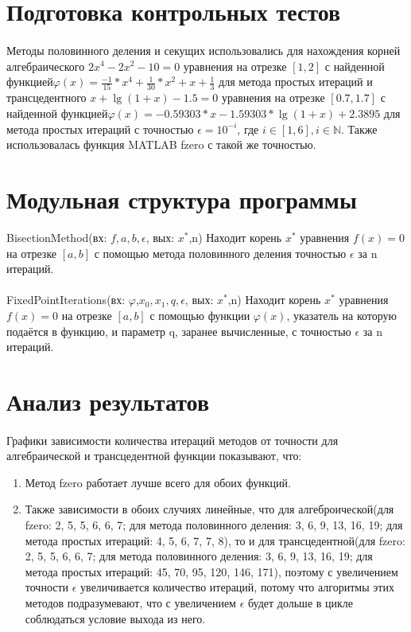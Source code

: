 \documentclass{article}
\begin{document}
	\section{Подготовка контрольных тестов}
	\paragraph{}Методы половинного деления и секущих использовались для нахождения корней алгебраического $2x^4-2x^2-10=0$ уравнения на отрезке $[1,2]$ с найденной функцией$\varphi(x) = \frac{-1}{15}*x^4 + \frac{1}{30}*x^2 + x + \frac{1}{3}$ для метода простых итераций и трансцедентного $x + \lg{(1+x)}-1.5=0$ уравнения на отрезке $[0.7,1.7]$ с найденной функцией$\varphi(x) = - 0.59303*x -1.59303*\lg{(1+x)} + 2.3895$ для метода простых итераций с точностью $\epsilon=10^{-i}$, где $i \in [1, 6], i \in \mathbb {N} $. Также использовалась
	функция MATLAB fzero с такой же точностью.

	\section{Модульная структура программы}
	BisectionMethod(вх: $f,a,b,\epsilon$, вых: $x^*$,n) Находит корень $x^*$ уравнения $f(x)=0$ на отрезке $[a, b]$ с помощью метода половинного деления точностью $\epsilon$ за n итераций.
	~\\
	~\\
	FixedPointIterations(вх: $\varphi$,$x_0,x_1,q,\epsilon$, вых: $x^*$,n) Находит корень $x^*$ уравнения $f(x)=0$ на отрезке $[a, b]$ с помощью функции $\varphi(x)$, указатель на которую подаётся в функцию, и параметр q, заранее вычисленные,  с точностью $\epsilon$ за n итераций.
	\section{Анализ результатов}
	\paragraph{}Графики зависимости количества итераций методов от точности для алгебраической и трансцедентной функции показывают, что: 
	\begin{enumerate}
	\item Метод fzero работает лучше всего для обоих функций. 
	\item Также зависимости в обоих случиях линейные, что для алгеброической(для fzero: 2, 5, 5, 6, 6, 7; для метода половинного деления: 3, 6, 9, 13, 16, 19; для метода простых итераций: 4, 5, 6, 7, 7, 8), то и для трансцедентной(для fzero: 2, 5, 5, 6, 6, 7; для метода половинного деления: 3, 6, 9, 13, 16, 19; для метода простых итераций: 45, 70, 95, 120, 146, 171), поэтому с увеличением точности $\epsilon$ увеличивается количество итераций, потому что алгоритмы этих методов подразумевают, что с увеличением $\epsilon$ будет дольше в цикле соблюдаться условие выхода из него.
	\end{enumerate}
\end{document}
